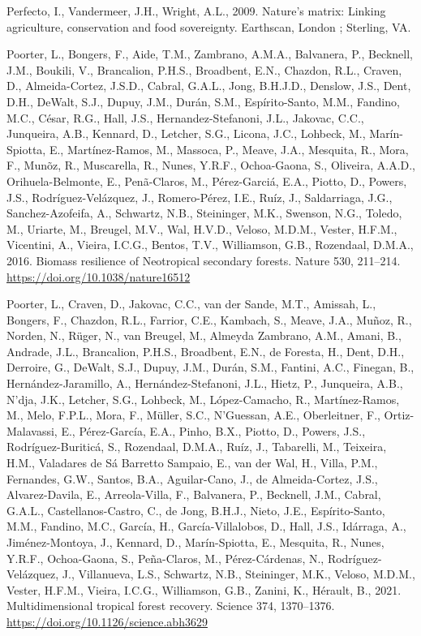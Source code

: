 \documentclass[
  12pt,
]{article}
\newlength{\cslhangindent}
\newlength{\cslentryspacingunit} %
\newenvironment{CSLReferences}[2] %
 {%
  \setlength{\parindent}{0pt}
  \ifodd #1
  \let\oldpar\par
  \def\par{\hangindent=\cslhangindent\oldpar}
  \fi
  \setlength{\parskip}{#2\cslentryspacingunit}
 }%
 {}
\begin{document}
\begin{CSLReferences}{1}{0}
\leavevmode{}%
Perfecto, I., Vandermeer, J.H., Wright, A.L., 2009. Nature's matrix: Linking agriculture, conservation and food sovereignty. {Earthscan}, {London ; Sterling, VA}.

\leavevmode{}%
Poorter, L., Bongers, F., Aide, T.M., Zambrano, A.M.A., Balvanera, P., Becknell, J.M., Boukili, V., Brancalion, P.H.S., Broadbent, E.N., Chazdon, R.L., Craven, D., Almeida-Cortez, J.S.D., Cabral, G.A.L., Jong, B.H.J.D., Denslow, J.S., Dent, D.H., DeWalt, S.J., Dupuy, J.M., Durán, S.M., Espírito-Santo, M.M., Fandino, M.C., César, R.G., Hall, J.S., Hernandez-Stefanoni, J.L., Jakovac, C.C., Junqueira, A.B., Kennard, D., Letcher, S.G., Licona, J.C., Lohbeck, M., Marín-Spiotta, E., Martínez-Ramos, M., Massoca, P., Meave, J.A., Mesquita, R., Mora, F., Munõz, R., Muscarella, R., Nunes, Y.R.F., Ochoa-Gaona, S., Oliveira, A.A.D., Orihuela-Belmonte, E., Penã-Claros, M., Pérez-Garciá, E.A., Piotto, D., Powers, J.S., Rodríguez-Velázquez, J., Romero-Pérez, I.E., Ruíz, J., Saldarriaga, J.G., Sanchez-Azofeifa, A., Schwartz, N.B., Steininger, M.K., Swenson, N.G., Toledo, M., Uriarte, M., Breugel, M.V., Wal, H.V.D., Veloso, M.D.M., Vester, H.F.M., Vicentini, A., Vieira, I.C.G., Bentos, T.V., Williamson, G.B., Rozendaal, D.M.A., 2016. Biomass resilience of {Neotropical} secondary forests. Nature 530, 211--214. \url{https://doi.org/10.1038/nature16512}

\leavevmode{}%
Poorter, L., Craven, D., Jakovac, C.C., van der Sande, M.T., Amissah, L., Bongers, F., Chazdon, R.L., Farrior, C.E., Kambach, S., Meave, J.A., Muñoz, R., Norden, N., Rüger, N., van Breugel, M., Almeyda Zambrano, A.M., Amani, B., Andrade, J.L., Brancalion, P.H.S., Broadbent, E.N., de Foresta, H., Dent, D.H., Derroire, G., DeWalt, S.J., Dupuy, J.M., Durán, S.M., Fantini, A.C., Finegan, B., Hernández-Jaramillo, A., Hernández-Stefanoni, J.L., Hietz, P., Junqueira, A.B., N'dja, J.K., Letcher, S.G., Lohbeck, M., López-Camacho, R., Martínez-Ramos, M., Melo, F.P.L., Mora, F., Müller, S.C., N'Guessan, A.E., Oberleitner, F., Ortiz-Malavassi, E., Pérez-García, E.A., Pinho, B.X., Piotto, D., Powers, J.S., Rodríguez-Buriticá, S., Rozendaal, D.M.A., Ruíz, J., Tabarelli, M., Teixeira, H.M., Valadares de Sá Barretto Sampaio, E., van der Wal, H., Villa, P.M., Fernandes, G.W., Santos, B.A., Aguilar-Cano, J., de Almeida-Cortez, J.S., Alvarez-Davila, E., Arreola-Villa, F., Balvanera, P., Becknell, J.M., Cabral, G.A.L., Castellanos-Castro, C., de Jong, B.H.J., Nieto, J.E., Espírito-Santo, M.M., Fandino, M.C., García, H., García-Villalobos, D., Hall, J.S., Idárraga, A., Jiménez-Montoya, J., Kennard, D., Marín-Spiotta, E., Mesquita, R., Nunes, Y.R.F., Ochoa-Gaona, S., Peña-Claros, M., Pérez-Cárdenas, N., Rodríguez-Velázquez, J., Villanueva, L.S., Schwartz, N.B., Steininger, M.K., Veloso, M.D.M., Vester, H.F.M., Vieira, I.C.G., Williamson, G.B., Zanini, K., Hérault, B., 2021. Multidimensional tropical forest recovery. Science 374, 1370--1376. \url{https://doi.org/10.1126/science.abh3629}


\end{CSLReferences}
\end{document}
